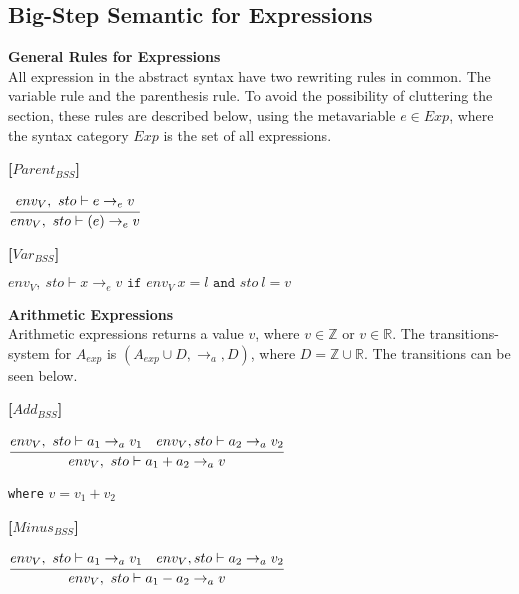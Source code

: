 {\subsection{Big-Step Semantic for Expressions}

\textbf{\large{General Rules for Expressions}} \\
All expression in the abstract syntax have two rewriting rules in common.
The variable rule and the parenthesis rule.
To avoid the possibility of cluttering the section, these rules are described below, using the metavariable $e \in Exp$, where the syntax category $Exp$ is the set of all expressions.

\textbf{[$Parent_{BSS}$]}
\begin{center}
	\begin{math}
	\cfrac
		{env_V,\ sto \vdash e \rightarrow_e v}
		{env_V,\ sto \vdash (e) \rightarrow_e v}
	\end{math}
\end{center}

\textbf{[$Var_{BSS}$]}
\begin{center}
	\begin{math}
	env_V,\ sto \vdash x \rightarrow_e v
	\texttt{ if } env_V\ x = l
	\texttt{ and } sto\ l = v
	\end{math}
\end{center}

\textbf{\large{Arithmetic Expressions}}\\
Arithmetic expressions returns a value $v$, where $v \in \mathbb{Z}$ or $v \in \mathbb{R}$.
The transitions-system for $A_{exp}$ is $(A_{exp} \cup D, \rightarrow_a, D)$, 
where $D = \mathbb{Z} \cup \mathbb{R}$.
The transitions can be seen below.

\textbf{[$Add_{BSS}$]}\\
\begin{center}
	\begin{math}
	\cfrac
		{env_V,\ sto \vdash a_1 \rightarrow_a v_1 \quad env_V, sto \vdash a_2 \rightarrow_a v_2}
		{env_V,\ sto \vdash a_1 + a_2 \rightarrow_a v}
	\end{math}
	
	
	\texttt{where} $v = v_1 + v_2$
\end{center}

\textbf{[$Minus_{BSS}$]}\\
\begin{center}
	\begin{math}
	\cfrac
		{env_V,\ sto \vdash a_1 \rightarrow_a v_1 \quad env_V, sto \vdash a_2 \rightarrow_a v_2}
		{env_V,\ sto \vdash a_1 - a_2 \rightarrow_a v}
	\end{math}
	

\end{center}}
